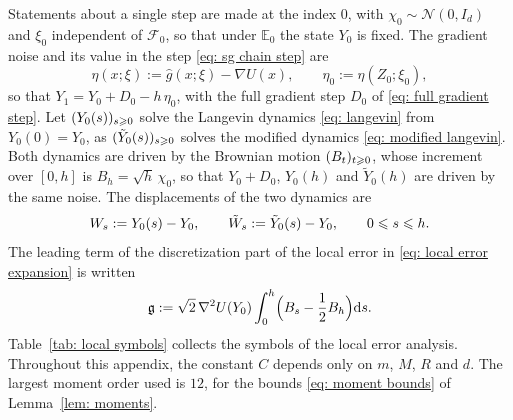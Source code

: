 Statements about a single step are made at the index $0$, with $\chi_0 \sim \mathcal N(0, I_d)$ and $\xi_0$ independent of $\mathcal F_0$, so that under $\mathbb E_0$ the state $Y_0$ is fixed. The gradient noise and its value in the step \eqref{eq: sg chain step} are
\begin{equation}
    \eta(x;\xi) := \hat g(x;\xi) - \nabla U(x) , \qquad \eta_0 := \eta(Z_0;\xi_0) ,
    \label{eq: gradient noise}
\end{equation}
so that $Y_1 = Y_0 + D_0 - h\, \eta_0$, with the full gradient step $D_0$ of \eqref{eq: full gradient step}. Let $(Y_0(s))_{s \geqslant 0}$ solve the Langevin dynamics \eqref{eq: langevin} from $Y_0(0) = Y_0$, as $(\tilde Y_0(s))_{s \geqslant 0}$ solves the modified dynamics \eqref{eq: modified langevin}. Both dynamics are driven by the Brownian motion $(B_t)_{t \geqslant 0}$, whose increment over $[0,h]$ is $B_h = \sqrt h\, \chi_0$, so that $Y_0 + D_0$, $Y_0(h)$ and $\tilde Y_0(h)$ are driven by the same noise. The displacements of the two dynamics are
\begin{equation}
    W_s := Y_0(s) - Y_0 , \qquad \tilde W_s := \tilde Y_0(s) - Y_0 , \qquad 0 \leqslant s \leqslant h .
    \label{eq: displacements}
\end{equation}
The leading term of the discretization part of the local error in \eqref{eq: local error expansion} is written
\begin{equation}
    \mathfrak g := \sqrt2\, \nabla^2 U(Y_0) \int_0^h \Bigl( B_s - \frac12 B_h \Bigr) \mathrm{d} s .
    \label{eq: leading term}
\end{equation}
Table~\ref{tab: local symbols} collects the symbols of the local error analysis. Throughout this appendix, the constant $C$ depends only on $m$, $M$, $R$ and $d$. The largest moment order used is $12$, for the bounds \eqref{eq: moment bounds} of Lemma~\ref{lem: moments}.


